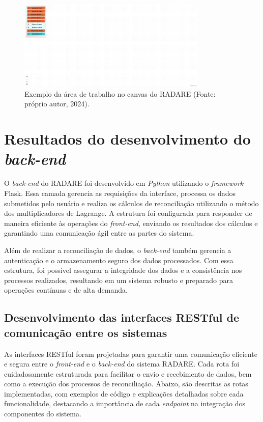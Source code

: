 \begin{figure}[htbp]
    \centering
    \includegraphics[width=0.8\textwidth]{figuras/empty-canvas.png}
    \caption{Exemplo da área de trabalho no canvas do RADARE (Fonte: próprio autor, 2024).}
    \label{Fig:CanvasArea}
\end{figure}

\section{Resultados do desenvolvimento do \textit{back-end}}

O \textit{back-end} do RADARE foi desenvolvido em \textit{Python} utilizando o \textit{framework} Flask. Essa camada gerencia as requisições da interface, processa os dados submetidos pelo usuário e realiza os cálculos de reconciliação utilizando o método dos multiplicadores de Lagrange. A estrutura foi configurada para responder de maneira eficiente às operações do \textit{front-end}, enviando os resultados dos cálculos e garantindo uma comunicação ágil entre as partes do sistema.

Além de realizar a reconciliação de dados, o \textit{back-end} também gerencia a autenticação e o armazenamento seguro dos dados processados. Com essa estrutura, foi possível assegurar a integridade dos dados e a consistência nos processos realizados, resultando em um sistema robusto e preparado para operações contínuas e de alta demanda.

\subsection{Desenvolvimento das interfaces RESTful de comunicação entre os sistemas}

As interfaces RESTful foram projetadas para garantir uma comunicação eficiente e segura entre o \textit{front-end} e o \textit{back-end} do sistema RADARE. Cada rota foi cuidadosamente estruturada para facilitar o envio e recebimento de dados, bem como a execução dos processos de reconciliação. Abaixo, são descritas as rotas implementadas, com exemplos de código e explicações detalhadas sobre cada funcionalidade, destacando a importância de cada \textit{endpoint} na integração dos componentes do sistema.


